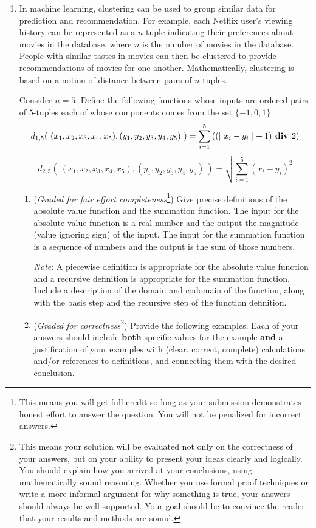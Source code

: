 \documentclass[12pt, oneside]{article}
\begin{document}
\begin{enumerate}

\item  In machine learning, clustering can be used to group similar data for prediction and recommendation.  For example,
each Netflix user's viewing history can be represented as a $n$-tuple indicating their preferences about
movies in the database, where $n$ is the number of movies in the database.  People with similar tastes in movies can then be clustered to provide recommendations
of movies for one another.  Mathematically, clustering is based on a notion of distance between pairs of $n$-tuples.

Consider $n=5$.  Define the following functions whose inputs are ordered pairs of $5$-tuples each of whose components
comes from the set $\{-1,0,1\}$
\[
d_{1,5}(~ (x_1, x_2, x_3, x_4, x_5) , (y_1, y_2, y_3, y_4, y_5) ~) =  \sum_{i=1}^5\left( (\lvert~x_i-y_i~\rvert + 1) \textbf{ div } 2 \right) 
\]
\[
d_{2,5}(~ (x_1, x_2, x_3, x_4, x_5) , (y_1, y_2, y_3, y_4, y_5) ~) =  \sqrt{ \sum_{i=1}^5 (x_i - y_i)^2}
\]


\begin{enumerate}
\item ({\it Graded for fair effort completeness}\footnote{This means you will get full credit so long as your submission demonstrates honest effort to answer the question. You will not be penalized for incorrect answers.}) 
Give precise definitions of the absolute value function and the summation function.
The input for the absolute value function is a real number and the output the magnitude
(value ignoring sign) of the input. The input for the summation function is a sequence of numbers and the output
is the sum of those numbers.

{\it Note}: A piecewise definition is appropriate for the absolute value function and a recursive definition is appropriate
for the summation function. Include a description of the domain and codomain of the function, along with the
basis step and the recursive step of the function definition.

\item ({\it Graded for correctness}\footnote{This means your solution will be
evaluated not only on the correctness of your answers, but on your ability to 
present your ideas clearly and logically. You should explain how you arrived at your conclusions, using 
mathematically sound reasoning. Whether you use formal proof techniques or write a more informal argument for why 
something is true, your answers should always be well-supported. Your goal should be to convince the reader that 
your results and methods are sound.}) Provide the following examples.  
Each of your answers should include  {\bf both} specific values for the example {\bf and} a justification 
of your examples with (clear, correct, complete) calculations and/or references to definitions, and connecting them with
the desired conclusion.


\end{enumerate}
\end{enumerate}
\end{document}
